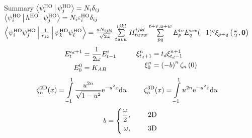 \documentclass[10pt, t]{beamer}
\begin{document}
\begin{frame}[fragile]{Summary}
    \centering\small
    $\Braket{\psiHO_i|\psiHO_j} = N_i \delta_{ij}$ \\
    $\Braket{\psiHO_i|h^{\text{HO}}|\psiHO_j} =
    N_i\varepsilon^{\text{HO}}_i\delta_{ij}$ \\
    $\Braket{\psiHO_i\psiHO_j|\frac{1}{r_{12}}|\psiHO_k\psiHO_l} =
    \frac{aN_{ijkl}}{\sqrt{2\omega}}  \sum\limits^{ijkl}_{tuvw} H^{ijkl}_{tuvw}
    \suml{pq}{t+v,u+w} E^{tv}_pE^{uw}_q (-1)^q\xi_{p+q}\left(\frac{\omega}{2},
    \blds{0}\right)$
        \begin{equation*}
            \begin{aligned}
                E^{i_d+1}_t &= \frac{1}{2\omega}E^{i}_{t-1} \\
                E^{0}_0 &= K_{AB}
            \end{aligned}\hspace{1.0cm}
            \begin{aligned}
                \xi^n_{t_d+1} &= t_d\xi^{n+1}_{t_d-1} \\
                \xi^n_0 &= \left(-b\right)^n \zeta_n\left(0\right)
            \end{aligned}
        \end{equation*}
        \begin{equation*}
            \begin{aligned}
                \zeta^{\text{2D}}_n(x) &= \int\limits^1_{-1} \frac{u^{2n}}{\sqrt{1 -
                u^2}} \me^{-u^2x} \md u
            \end{aligned} \hspace{0.5cm}
            \begin{aligned}
                \zeta^{\text{3D}}_n(x) &= \int\limits^1_{-1} u^{2n} \me^{-u^2x}
                \md u
            \end{aligned}
        \end{equation*}
        \begin{equation*}
            b =
            \left\{\begin{aligned}
                \frac{\omega}{2},&\indent &\text{2D} \\
                \omega,&\indent &\text{3D}
            \end{aligned}\right.
        \end{equation*}
\end{frame}
\end{document}
